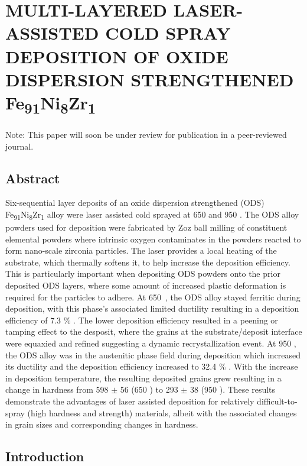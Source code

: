 

\chapter{MULTI-LAYERED LASER-ASSISTED COLD SPRAY DEPOSITION OF OXIDE DISPERSION STRENGTHENED Fe\textsubscript{91}Ni\textsubscript{8}Zr\textsubscript{1}}

 

Note: This paper will soon be under review for publication in a peer-reviewed journal.




\section*{Abstract}

	Six-sequential layer deposits of an oxide dispersion strengthened (ODS) Fe\textsubscript{91}Ni\textsubscript{8}Zr\textsubscript{1} alloy were laser assisted cold sprayed at 650 \celsius{} and 950 \celsius{}. The ODS alloy powders used for deposition were fabricated by Zoz ball milling of constituent elemental powders where intrinsic oxygen contaminates in the powders reacted to form nano-scale zirconia particles. The laser provides a local heating of the substrate, which thermally softens it, to help increase the deposition efficiency. This is particularly important when depositing ODS powders onto the prior deposited ODS layers, where some amount of increased plastic deformation is required for the particles to adhere. At 650 \celsius{}, the ODS alloy stayed ferritic during deposition, with this phase’s associated limited ductility resulting in a deposition efficiency of 7.3 $\%$ . The lower deposition efficiency resulted in a peening or tamping effect to the desposit, where the grains at the substrate/deposit interface were equaxied and refined suggesting a dynamic recrystallization event. At 950 \celsius{}, the ODS alloy was in the austenitic phase field during deposition which increased its ductility and the deposition efficiency increased to 32.4 $\%$ . With the increase in deposition temperature, the resulting deposited grains grew resulting in a change in hardness from 598 $ \pm $  56 (650 \celsius{}) to 293 $ \pm $  38 (950 \celsius{}). These results demonstrate the advantages of laser assisted deposition for relatively difficult-to-spray (high hardness and strength) materials, albeit with the associated changes in grain sizes and corresponding changes in hardness. 
	

	\section*{Introduction}

